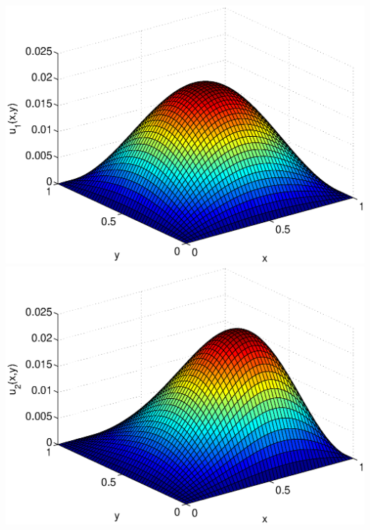 \begin{solution}
\begin{enumerate}
      \begin{center} 
          \includegraphics[scale=0.37]{twoD1}\quad
          \includegraphics[scale=0.37]{twoD2}


\end{center}
\end{enumerate}
\end{solution}
